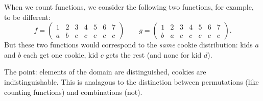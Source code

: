 \documentclass[10pt,]{book}
\theoremstyle{plain}
\theoremstyle{definition}
\theoremstyle{definition}
\theoremstyle{definition}
\numberwithin{equation}{section}
\newcommand{\twoline}[2]{\begin{pmatrix}#1 \\ #2 \end{pmatrix}}
\newcommand{\amp}{ & }
\begin{document}
    When we count functions, we consider the following two functions, for example, to be different:
    \begin{equation*}
      f = \twoline{1 \amp 2 \amp 3 \amp 4\amp 5 \amp 6 \amp 7}{a \amp b \amp c \amp c \amp c \amp c \amp c}  \qquad g = \twoline{1 \amp 2 \amp 3 \amp 4\amp 5 \amp 6 \amp 7}{b \amp a \amp c \amp c \amp c \amp c \amp c}.
    \end{equation*}
    But these two functions would correspond to the \emph{same} cookie distribution: kids \(a\) and \(b\) each get one cookie, kid \(c\) gets the rest (and none for kid \(d\)).
\par
 The point: elements of the domain are distinguished, cookies are indistinguishable.  This is analagous to the distinction between permutations (like counting functions) and combinations (not).
\typeout{************************************************}
\typeout{************************************************}
\end{document}

